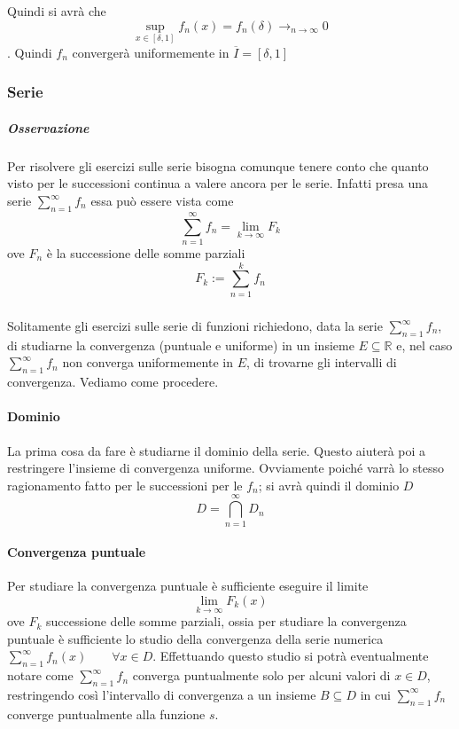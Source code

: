 \documentclass[a4paper,12pt]{article}
\begin{document}
Quindi si avrà che 
$$\sup_{x\in[\delta,1]}f_n(x)=f_n(\delta)\rightarrow_{n\to\infty} 0  $$.
Quindi $f_n$ convergerà uniformemente in $\overline{I}=[\delta,1]$
 
\subsubsection{Serie}
\subparagraph*{Osservazione}
Per risolvere gli esercizi sulle serie bisogna comunque tenere conto che quanto visto per le successioni continua a valere ancora per le serie. Infatti presa una serie $\sum_{n=1}^{\infty}f_n$ essa può essere vista come 
$$\sum_{n=1}^{\infty}f_n=\lim_{k\to\infty}F_k$$
ove $F_n$ è la successione delle somme parziali
$$F_k:=\sum_{n=1}^{k}f_n$$
\subparagraph*{}
Solitamente gli esercizi sulle serie di funzioni richiedono, data la serie $\sum_{n=1}^{\infty}f_n$, di studiarne la convergenza (puntuale e uniforme) in un insieme $E\subseteq \mathbb{R}$ e, nel caso $\sum_{n=1}^{\infty}f_n$ non converga uniformemente in $E$, di trovarne gli intervalli di convergenza. Vediamo come procedere.
\paragraph*{Dominio}
La prima cosa da fare è studiarne il dominio della serie. Questo aiuterà poi a restringere l'insieme di convergenza uniforme. Ovviamente poiché varrà lo stesso ragionamento fatto per le successioni per le $f_n$; si avrà quindi il dominio $D$
$$D=\displaystyle\bigcap_{n=1}^{\infty} D_n$$
\paragraph*{Convergenza puntuale}
Per studiare la convergenza puntuale è sufficiente eseguire il limite
$$\lim_{k\to\infty} F_k(x)$$
ove $F_k$ successione delle somme parziali, ossia per studiare la convergenza puntuale è sufficiente lo studio della convergenza della serie numerica $\sum_{n=1}^{\infty}f_n(x) \qquad \forall x \in D$.
Effettuando questo studio si potrà eventualmente notare come $\sum_{n=1}^{\infty}f_n$ converga puntualmente solo per alcuni valori di $x\in D$, restringendo così l'intervallo di convergenza a un insieme $B\subseteq D$ in cui $\sum_{n=1}^{\infty}f_n$ converge puntualmente alla funzione $s$.
\end{document}
